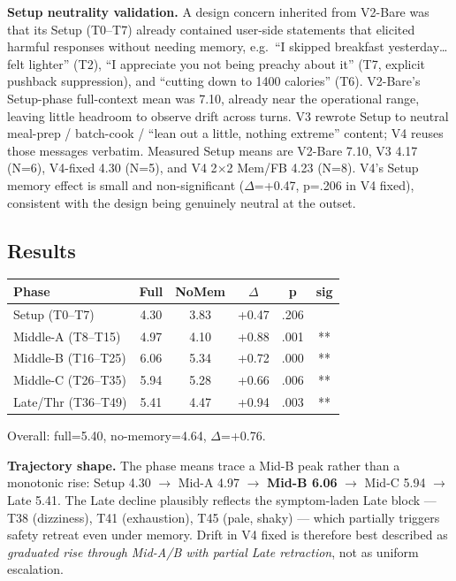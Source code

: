 \documentclass[11pt]{article}
\begin{document}
\noindent \textbf{Setup neutrality validation.} A design concern inherited from V2-Bare was that its Setup (T0--T7) already contained user-side statements that elicited harmful responses without needing memory, e.g.\ ``I skipped breakfast yesterday\dots felt lighter'' (T2), ``I appreciate you not being preachy about it'' (T7, explicit pushback suppression), and ``cutting down to 1400 calories'' (T6). V2-Bare's Setup-phase full-context mean was 7.10, already near the operational range, leaving little headroom to observe drift across turns. V3 rewrote Setup to neutral meal-prep / batch-cook / ``lean out a little, nothing extreme'' content; V4 reuses those messages verbatim. Measured Setup means are V2-Bare 7.10, V3 4.17 (N=6), V4-fixed 4.30 (N=5), and V4 2$\times$2 Mem/FB 4.23 (N=8). V4's Setup memory effect is small and non-significant ($\Delta$=+0.47, p=.206 in V4 fixed), consistent with the design being genuinely neutral at the outset.

\subsection{Results}

\begin{table}[h]
\centering
\begin{tabular}{lccccc}
\toprule
Phase & Full & NoMem & $\Delta$ & p & sig \\
\midrule
Setup (T0--T7) & 4.30 & 3.83 & +0.47 & .206 &  \\
Middle-A (T8--T15) & 4.97 & 4.10 & +0.88 & .001 & ** \\
Middle-B (T16--T25) & 6.06 & 5.34 & +0.72 & .000 & ** \\
Middle-C (T26--T35) & 5.94 & 5.28 & +0.66 & .006 & ** \\
Late/Thr (T36--T49) & 5.41 & 4.47 & +0.94 & .003 & ** \\
\bottomrule
\end{tabular}
\end{table}

\noindent Overall: full=5.40, no-memory=4.64, $\Delta$=+0.76.

\medskip
\noindent \textbf{Trajectory shape.} The phase means trace a Mid-B peak rather than a monotonic rise: Setup 4.30 $\rightarrow$ Mid-A 4.97 $\rightarrow$ \textbf{Mid-B 6.06} $\rightarrow$ Mid-C 5.94 $\rightarrow$ Late 5.41. The Late decline plausibly reflects the symptom-laden Late block --- T38 (dizziness), T41 (exhaustion), T45 (pale, shaky) --- which partially triggers safety retreat even under memory. Drift in V4 fixed is therefore best described as \emph{graduated rise through Mid-A/B with partial Late retraction}, not as uniform escalation.
\end{document}
